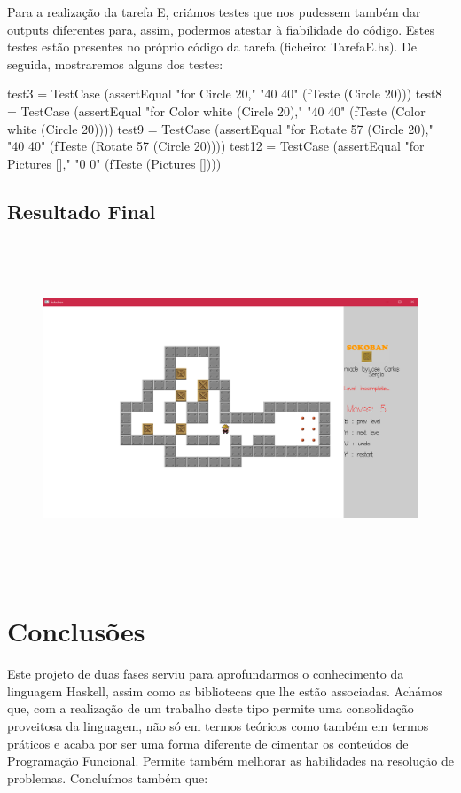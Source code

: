 \documentclass[a4paper]{article}
\begin{document}
Para a realização da tarefa E, criámos testes que nos pudessem também dar outputs diferentes para, assim, podermos atestar à fiabilidade do código. Estes testes estão presentes no próprio código da tarefa (ficheiro: TarefaE.hs). De seguida, mostraremos alguns dos testes:

\begin{spverbatim}
test3 = TestCase (assertEqual "for Circle 20," "40 40" (fTeste (Circle 20)))
test8 = TestCase (assertEqual "for Color white (Circle 20)," "40 40" (fTeste (Color white (Circle 20))))
test9 = TestCase (assertEqual "for Rotate 57 (Circle 20)," "40 40" (fTeste (Rotate 57 (Circle 20))))
test12 = TestCase (assertEqual "for Pictures []," "0 0" (fTeste (Pictures [])))
\end{spverbatim}
\pagebreak

\subsection{Resultado Final}
\begin{figure}[!htb]
\centering
\includegraphics[height=10cm, width=15cm]{jogofinal}
\end{figure}


\section{Conclusões}
\label{sec:conclusao}
Este projeto de duas fases serviu para aprofundarmos o conhecimento da linguagem Haskell, assim como as bibliotecas que lhe estão associadas. Achámos que, com a realização de um trabalho deste tipo permite uma consolidação proveitosa da linguagem, não só em termos teóricos como também em termos práticos e acaba por ser uma forma diferente de cimentar os conteúdos de Programação Funcional. Permite também melhorar as habilidades na resolução de problemas. Concluímos também que:
\end{document}
